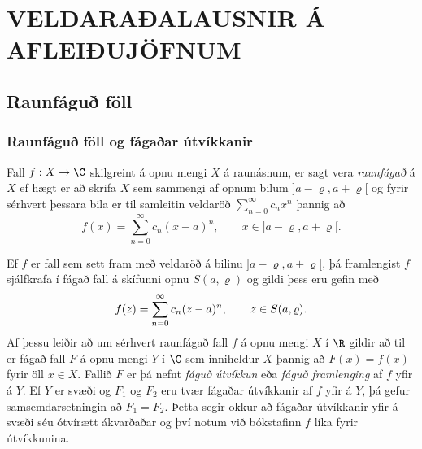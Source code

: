 
\chapter
{VELDARAÐALAUSNIR Á AFLEIÐUJÖFNUM}
 

\section{Raunfáguð föll}


\subsection*{Raunfáguð föll og fágaðar útvíkkanir}

\begin{sk}
Fall $f:X\to \C$ skilgreint á opnu mengi $X$ á raunásnum,  er sagt
vera {\it raunfágað} á $X$ ef hægt er að skrifa $X$
sem sammengi af opnum bilum $]a-\varrho,a+\varrho[$  og fyrir sérhvert
þessara bila er  til samleitin veldaröð $\sum_{n=0}^\infty c_nx^n$
þannig að
\begin{equation*}f(x)= \sum\limits_{n=0}^\infty c_n(x-a)^n, \qquad x\in
]a-\varrho,a+\varrho[.
\label{3.1.2}
\end{equation*}
\end{sk}

Ef $f$ er fall sem sett fram með veldaröð á bilinu
$]a-\varrho,a+\varrho[$, þá framlengist $f$ sjálfkrafa í fágað fall
á skífunni opnu $S(a,\varrho)$ og gildi þess eru gefin með 
$$f(z)=\sum\limits_{n=0}\sp\infty c_n(z-a)\sp n, \qquad z\in
S(a,\varrho).
$$
Af þessu leiðir að um sérhvert raunfágað fall $f$ á opnu mengi $X$ í
$\R$ gildir að til er fágað fall $F$ á opnu mengi $Y$ í $\C$ sem
inniheldur $X$ þannig að $F(x)=f(x)$ fyrir öll $x\in X$. 
Fallið $F$ er þá nefnt {\it fáguð útvíkkun} eða {\it fáguð
framlenging}  af $f$ yfir á $Y$.  Ef $Y$ er svæði og $F_1$ og $F_2$ eru
tvær fágaðar útvíkkanir  af $f$ yfir á $Y$, þá gefur
samsemdarsetningin  að $F_1=F_2$.  Þetta segir okkur að fágaðar
útvíkkanir  yfir á svæði séu ótvírætt ákvarðaðar og því notum við
bókstafinn $f$ líka fyrir útvíkkunina. 

